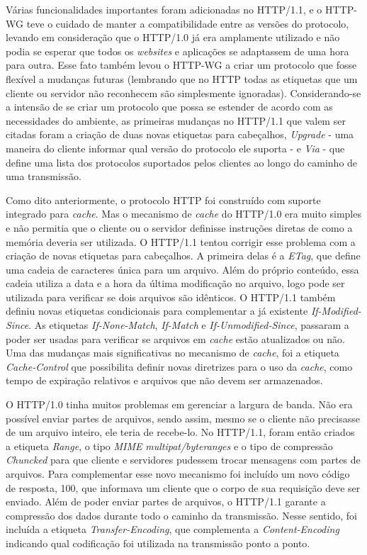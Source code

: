 Várias funcionalidades importantes foram adicionadas no HTTP/1.1, e o HTTP-WG teve o cuidado de manter a compatibilidade entre as versões do protocolo, levando em consideração que o HTTP/1.0 já era amplamente utilizado e não podia se esperar que todos os \textit{websites} e aplicações se adaptassem de uma hora para outra. Esse fato também levou o HTTP-WG a criar um protocolo que fosse flexível a mudanças futuras (lembrando que no HTTP todas as etiquetas que um cliente ou servidor não reconhecem são simplesmente ignoradas). Considerando-se a intensão de se criar um protocolo que possa se estender de acordo com as necessidades do ambiente, as primeiras mudanças no HTTP/1.1 que valem ser citadas foram a criação de duas novas etiquetas para cabeçalhos, \textit{Upgrade} - uma maneira do cliente informar qual versão do protocolo ele suporta - e \textit{Via} - que define uma lista dos protocolos suportados pelos clientes ao longo do caminho de uma transmissão. \cite{Tanenbaum}

Como dito anteriormente, o protocolo HTTP foi construído com suporte integrado para \textit{cache}. Mas o mecanismo de \textit{cache} do HTTP/1.0 era muito simples e não permitia que o cliente ou o servidor definisse instruções diretas de como a memória deveria ser utilizada. O HTTP/1.1 tentou corrigir esse problema com a criação de novas etiquetas para cabeçalhos. A primeira delas é a \textit{ETag}, que define uma cadeia de caracteres única para um arquivo. Além do próprio conteúdo, essa cadeia utiliza a data e a hora da última modificação no arquivo, logo pode ser utilizada para verificar se dois arquivos são idênticos. O HTTP/1.1 também definiu novas etiquetas condicionais para complementar a já existente \textit{If-Modified-Since}. As etiquetas \textit{If-None-Match}, \textit{If-Match} e \textit{If-Unmodified-Since}, passaram a poder ser usadas para verificar se arquivos em \textit{cache} estão atualizados ou não. Uma das mudanças mais significativas no mecanismo de \textit{cache}, foi a etiqueta \textit{Cache-Control} que possibilita definir novas diretrizes para o uso da \textit{cache}, como tempo de expiração relativos e arquivos que não devem ser armazenados. \cite{Tanenbaum}

O HTTP/1.0 tinha muitos problemas em gerenciar a largura de banda. Não era possível enviar partes de arquivos, sendo assim, mesmo se o cliente não precisasse de um arquivo inteiro, ele teria de recebe-lo. No HTTP/1.1, foram então criados a etiqueta \textit{Range}, o tipo \textit{MIME} \textit{multipat/byteranges} e o tipo de compressão \textit{Chuncked} para que cliente e servidores pudessem trocar mensagens com partes de arquivos. Para complementar esse novo mecanismo foi incluído um novo código de resposta, 100, que informava um cliente que o corpo de sua requisição deve ser enviado. Além de poder enviar partes de arquivos, o HTTP/1.1 garante a compressão dos dados durante todo o caminho da transmissão. Nesse sentido, foi incluída a etiqueta \textit{Transfer-Encoding}, que complementa a \textit{Content-Encoding} indicando qual codificação foi utilizada na transmissão ponto a ponto. \cite{Tanenbaum}

